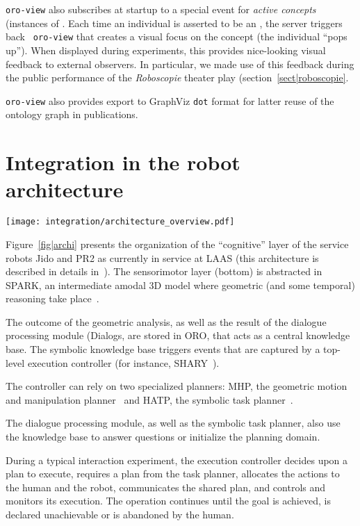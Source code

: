 {\tt oro-view} also subscribes at startup to a special event for \emph{active
concepts} (instances of . Each time an individual is
asserted to be an , the server triggers back {\tt
oro-view} that creates a visual focus on the concept (the individual ``pops
up''). When displayed during experiments, this provides nice-looking visual
feedback to external observers. In particular, we made use of this feedback
during the public performance of the \emph{Roboscopie} theater play
(section~\ref{sect|roboscopie}.

{\tt oro-view} also provides export to GraphViz {\tt dot} format for latter
reuse of the ontology graph in publications.

\section{Integration in the robot architecture}

\begin{figure*}[thpb]
  \centering
  \texttt{[image: integration/architecture\_overview.pdf]}
  \caption {Software architecture for a service robot interacting with humans.}
  \label{fig|archi}
\end{figure*}

Figure~\ref{fig|archi} presents the organization of the ``cognitive'' layer of
the service robots Jido and PR2 as currently in service at LAAS (this
architecture is described in details in~\cite{Alami2011}). The sensorimotor
layer (bottom) is abstracted in SPARK, an intermediate amodal 3D model where
geometric (and some temporal) reasoning take place~\cite{Sisbot2011}.

The outcome of the geometric analysis, as well as the result of the dialogue
processing module ({\sc Dialogs}, are stored in ORO, that acts as a central
knowledge base. The symbolic knowledge base triggers events that are captured
by a top-level execution controller (for instance, SHARY~\cite{Warnier2012}).

The controller can rely on two specialized planners: MHP, the geometric motion
and manipulation planner~\cite{Sisbot2008, Mainprice2011, Pandey2010} and HATP,
the symbolic task planner~\cite{Alili2008}.

The dialogue processing module, as well as the symbolic task planner, also use
the knowledge base to answer questions or initialize the planning domain.

During a typical interaction experiment, the execution controller decides upon
a plan to execute, requires a plan from the task planner, allocates the actions
to the human and the robot, communicates the shared plan, and controls and
monitors its execution. The operation continues until the goal is achieved, is
declared unachievable or is abandoned by the human.

